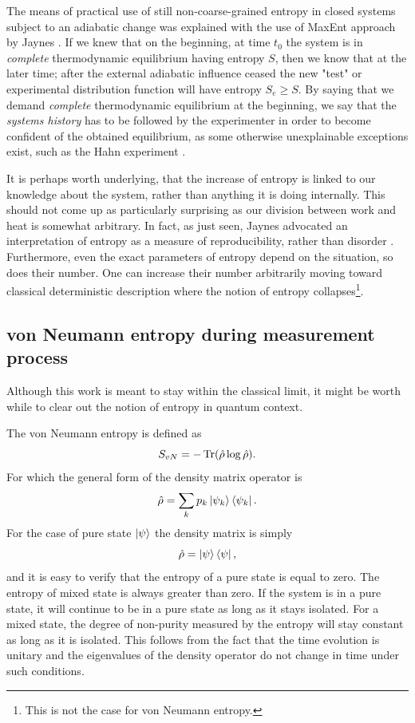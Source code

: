 \documentclass[a4paper,12pt]{article}
\begin{document}
The means of practical use of still non-coarse-grained entropy in closed systems subject to an adiabatic change was explained with the use of MaxEnt approach by Jaynes \cite{Jaynes:1965gg}. If we knew that on the beginning, at time $t_0$ the system is in \textit{complete} thermodynamic equilibrium having entropy $S$, then we know that at the later time; after the external adiabatic influence ceased the new "test" or experimental distribution function will have entropy $S_e \geq S$. By saying that we demand \textit{complete} thermodynamic equilibrium at the beginning, we say that the \textit{systems history} has to be followed by the experimenter in order to become confident of the obtained equilibrium, as some otherwise unexplainable exceptions exist, such as the Hahn experiment \cite{Hahn:1950zz}.

It is perhaps worth underlying, that the increase of entropy is linked to our knowledge about the system, rather than anything it is doing internally. This should not come up as particularly surprising as our division between work and heat is somewhat arbitrary. In fact, as just seen, Jaynes advocated an interpretation of entropy as a measure of reproducibility, rather than disorder \cite{Jaynes:1957zz}.
Furthermore, even the exact parameters of entropy depend on the situation, so does their number. One can increase their number arbitrarily moving toward classical deterministic description where the notion of entropy collapses\footnote{This is not the case for von Neumann entropy.}.

\subsection{von Neumann entropy during measurement process}

Although this work is meant to stay within the classical limit, it might be worth while to clear out the notion of entropy in quantum context.

The von Neumann entropy is defined as 
\begin{equation}
  S_{vN}= -\Tr(\hat{\rho} \log{\hat{\rho}}).
\end{equation}
For which the general form of the density matrix operator is
\begin{equation}
	\hat{\rho}=\sum_k p_k \ket{\psi_k}\bra{\psi_k} .
\end{equation}
For the case of pure state $\ket{\psi}$ the density matrix is simply
\begin{equation}
  \hat{\rho} = \ket{\psi}\bra{\psi},
\end{equation}
and it is easy to verify that the entropy of a pure state is equal to zero. The entropy of mixed state is always greater than zero.
If the system is in a pure state, it will continue to be in a pure state as long as it stays isolated. For a mixed state, the degree of non-purity measured by the entropy will stay constant as long as it is isolated. This follows from the fact that the time evolution is unitary and the eigenvalues of the density operator do not change in time under such conditions.
\end{document}
